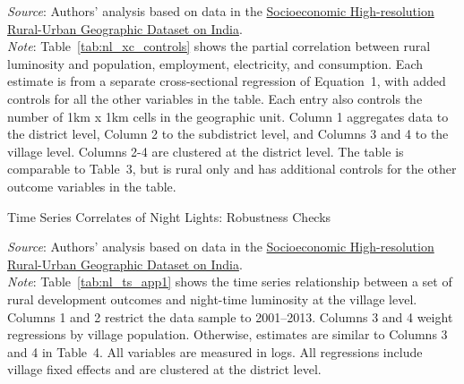 \documentclass[12pt,letterpaper]{article}
\begin{document}
\begin{appendix}
\begin{table}[H]
  \begin{center}
    \footnotesize{}
  \end{center}
  \footnotesize \textit{Source}: Authors' analysis based on data in the \href{http://www.devdatalab.org/shrug}{Socioeconomic High-resolution
    Rural-Urban Geographic Dataset on India}. \\
  \footnotesize \textit{Note}: Table~\ref{tab:nl_xc_controls} shows the partial
  correlation between rural luminosity and population, employment,
  electricity, and consumption. Each estimate is from a separate
  cross-sectional regression of Equation~1, with added
  controls for all the other variables in the table. Each entry also
  controls the number of 1km x 1km cells in the geographic
  unit. Column 1 aggregates data to the district level, Column 2 to
  the subdistrict level, and Columns 3 and 4 to the village
  level. Columns 2-4 are clustered at the district level. The table is
  comparable to Table~3, but is rural only and has additional controls
  for the other outcome variables in the table. 
  \label{tab:nl_xc_controls}
\end{table}


\begin{table}[H]
  \caption{Time Series Correlates of Night Lights: Robustness Checks} 
  
  \begin{center}
    \footnotesize{}
  \end{center}
  \footnotesize \textit{Source}: Authors' analysis based on data in the \href{http://www.devdatalab.org/shrug}{Socioeconomic High-resolution
    Rural-Urban Geographic Dataset on India}. \\
  \footnotesize \textit{Note}: Table~\ref{tab:nl_ts_app1} shows the time series
  relationship between a set of rural development outcomes and
  night-time luminosity at the village level. Columns 1 and 2 restrict
  the data sample to 2001--2013. Columns 3 and 4 weight regressions by
  village population. Otherwise, estimates are similar to Columns 3
  and 4 in Table~4. All variables are measured in
  logs. All regressions include village fixed effects and are
  clustered at the district level.
  \label{tab:nl_ts_app1}
\end{table}


\end{appendix}
\end{document}
